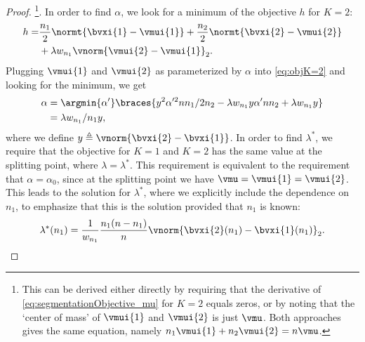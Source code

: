 \begin{proof}
\footnote{This can be derived either directly by requiring that the derivative of \eqref{eq:segmentationObjective_mu} for $K=2$
equals zeros, or by noting that the `center of mass' of $\vmui{1}$ and $\vmui{2}$ is just $\vmu$. Both approaches gives the
same equation, namely $n_1\vmui{1}+n_2\vmui{2}=n\vmu$.}.
In order to find $\alpha$, we look for a minimum of the objective $h$ for $K=2$:
\begin{align}\label{eq:objK=2}
    h =& \frac{n_1}{2}\normt{\bvxi{1}-\vmui{1}}+\frac{n_2}{2}\normt{\bvxi{2}-\vmui{2}}\\
    &+\lambda w_{n_1}\vnorm{\vmui{2}-\vmui{1}}_2.\nonumber
\end{align}
Plugging $\vmui{1}$ and $\vmui{2}$ as parameterized by $\alpha$ into \eqref{eq:objK=2} and looking for the minimum, we get
\begin{align*}%
\alpha & = \argmin{\alpha'}\braces{y^2\alpha'^2{nn_1}/{2n_2}-\lambda w_{n_1} y\alpha'{n}{n_2}+\lambda w_{n_1} y}\\
& = {\lambda w_{n_1}}/{n_1y},\nonumber
\end{align*}
where we define $y\triangleq \vnorm{\bvxi{2}-\bvxi{1}}$. In order to find $\lambda^*$, we require that the objective for $K=1$
and $K=2$ has the same value at the splitting point, where $\lambda=\lambda^*$. This requirement is equivalent to the requirement
that $\alpha=\alpha_0$, since at the splitting point we have $\vmu=\vmui{1}=\vmui{2}$. This leads to the solution for $\lambda^*$,
where we explicitly include the dependence on $n_1$, to emphasize that this is the solution provided that $n_1$ is known:
\begin{equation}\label{eq:lambdaStar_n1}
    \lambda^*(n_1)=\frac{1}{w_{n_1}}\frac{n_1(n-n_1)}{n}\vnorm{\bvxi{2}(n_1)-\bvxi{1}(n_1)}_2.
\end{equation}



\end{proof}
